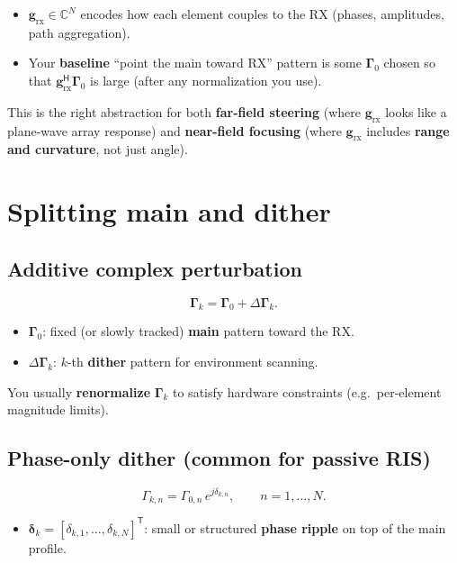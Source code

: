 \documentclass[11pt,a4paper]{article}
\newcommand{\C}{\mathbb{C}}
\newcommand{\rx}{\mathrm{rx}}
\begin{document}
\begin{itemize}
\item $\mathbf{g}_{\rx} \in \C^N$ encodes how each element couples to the RX (phases, amplitudes, path aggregation).
\item Your \textbf{baseline} ``point the main toward RX'' pattern is some $\bm{\Gamma}_0$ chosen so that $\mathbf{g}_{\rx}^{\mathsf{H}} \bm{\Gamma}_0$ is large (after any normalization you use).
\end{itemize}

This is the right abstraction for both \textbf{far-field steering} (where $\mathbf{g}_{\rx}$ looks like a plane-wave array response) and \textbf{near-field focusing} (where $\mathbf{g}_{\rx}$ includes \textbf{range and curvature}, not just angle).

\section{Splitting main and dither}

\subsection{Additive complex perturbation}
\begin{equation}
\bm{\Gamma}_k = \bm{\Gamma}_0 + \Delta\bm{\Gamma}_k.
\end{equation}
\begin{itemize}
\item $\bm{\Gamma}_0$: fixed (or slowly tracked) \textbf{main} pattern toward the RX.
\item $\Delta\bm{\Gamma}_k$: $k$-th \textbf{dither} pattern for environment scanning.
\end{itemize}

You usually \textbf{renormalize} $\bm{\Gamma}_k$ to satisfy hardware constraints (e.g.\ per-element magnitude limits).

\subsection{Phase-only dither (common for passive RIS)}
\begin{equation}
\Gamma_{k,n} = \Gamma_{0,n}\, e^{j \delta_{k,n}}, \qquad n = 1,\ldots,N.
\end{equation}
\begin{itemize}
\item $\bm{\delta}_k = [\delta_{k,1},\ldots,\delta_{k,N}]^{\mathsf{T}}$: small or structured \textbf{phase ripple} on top of the main profile.
\end{itemize}
\end{document}
